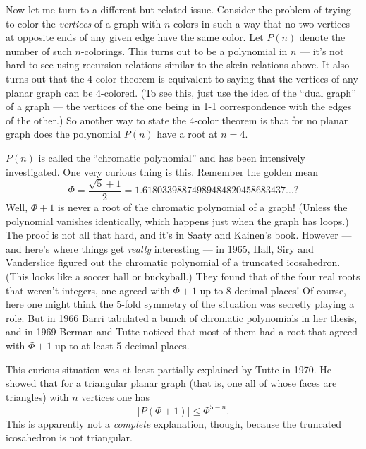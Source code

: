 \documentclass[12pt]{article}
\begin{document}
Now let me turn to a different but related issue. Consider the problem
of trying to color the \emph{vertices} of a graph with \(n\) colors in
such a way that no two vertices at opposite ends of any given edge have
the same color. Let \(P(n)\) denote the number of such \(n\)-colorings.
This turns out to be a polynomial in \(n\) --- it's not hard to see
using recursion relations similar to the skein relations above. It also
turns out that the 4-color theorem is equivalent to saying that the
vertices of any planar graph can be 4-colored. (To see this, just use
the idea of the ``dual graph'' of a graph --- the vertices of the one
being in 1-1 correspondence with the edges of the other.) So another way
to state the 4-color theorem is that for no planar graph does the
polynomial \(P(n)\) have a root at \(n = 4\).

\(P(n)\) is called the ``chromatic polynomial'' and has been intensively
investigated. One very curious thing is this. Remember the golden mean
\[\Phi = \frac{\sqrt{5} + 1}{2} = 1.61803398874989484820458683437\ldots?\]
Well, \(\Phi + 1\) is never a root of the chromatic polynomial of a graph!
(Unless the polynomial vanishes identically, which happens just when the
graph has loops.) The proof is not all that hard, and it's in Saaty and
Kainen's book. However --- and here's where things get \emph{really}
interesting --- in 1965, Hall, Siry and Vanderslice figured out the
chromatic polynomial of a truncated icosahedron. (This looks like a
soccer ball or buckyball.) They found that of the four real roots that
weren't integers, one agreed with \(\Phi + 1\) up to 8 decimal places! Of
course, here one might think the 5-fold symmetry of the situation was
secretly playing a role. But in 1966 Barri tabulated a bunch of
chromatic polynomials in her thesis, and in 1969 Berman and Tutte
noticed that most of them had a root that agreed with \(\Phi + 1\) up to at
least 5 decimal places.

This curious situation was at least partially explained by Tutte in
1970. He showed that for a triangular planar graph (that is, one all of
whose faces are triangles) with \(n\) vertices one has
\[|P(\Phi + 1)| \leqslant \Phi^{5-n}.\] This is apparently not a
\emph{complete} explanation, though, because the truncated icosahedron
is not triangular.
\end{document}
